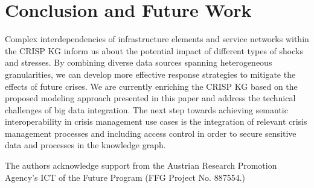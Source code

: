 \documentclass[
]{ceurart}
\begin{document}

\section{Conclusion and Future Work}

Complex interdependencies of infrastructure elements and service networks within the CRISP KG inform us about the potential impact of different types of shocks and stresses. By combining diverse data sources spanning heterogeneous granularities, we can develop more effective response strategies to mitigate the effects of future crises. We are currently enriching the CRISP KG based on the proposed modeling approach presented in this paper and address the technical challenges of big data integration. The next step towards achieving semantic interoperability in crisis management use cases is the integration of relevant crisis management processes and including access control in order to secure sensitive data and processes in the knowledge graph.




\begin{acknowledgments}
The authors acknowledge support from the Austrian Research Promotion Agency's ICT of the Future Program (FFG Project No. 887554.)
\end{acknowledgments}



\appendix
\end{document}
